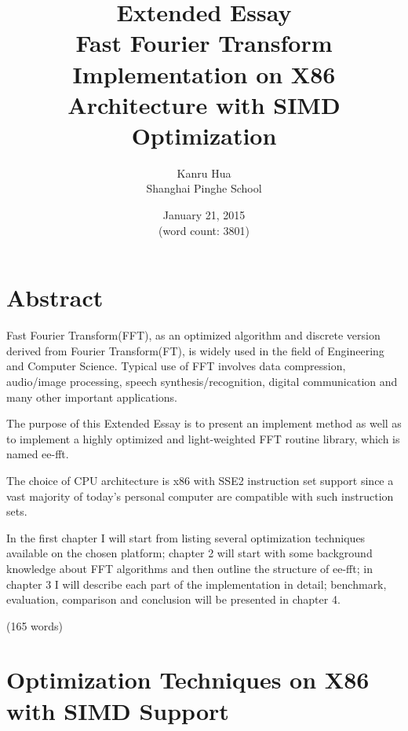 \documentclass[a4paper]{report}
\begin{document}
\title{\Huge{Extended Essay} \\[2cm] \Large{Fast Fourier Transform Implementation on X86 Architecture with SIMD Optimization} \\[1cm]}
\author{Kanru Hua \\[0.5cm] Shanghai Pinghe School}
\date{January 21, 2015 \\[1cm] (word count: 3801)}
\maketitle

\newpage

\chapter*{Abstract} \indent

	Fast Fourier Transform(FFT), as an optimized algorithm and discrete version derived from Fourier Transform(FT), is widely used in the field of Engineering and Computer Science. %
	Typical use of FFT involves data compression, audio/image processing, speech synthesis/recognition, digital communication and many other important applications.
	
	The purpose of this Extended Essay is to present an implement method as well as to implement a highly optimized and light-weighted FFT routine library, which is named ee-fft.

	The choice of CPU architecture is x86 with SSE2 instruction set support since a vast majority of today's personal computer are compatible with such instruction sets.
	
	In the first chapter I will start from listing several optimization techniques available on the chosen platform; chapter 2 will start with some background knowledge about FFT algorithms and then outline the structure of ee-fft; in chapter 3 I will describe each part of the implementation in detail; benchmark, evaluation, comparison and conclusion will be presented in chapter 4.
	
	\hfill (165 words)

\newpage
\tableofcontents

\newpage

\setcounter{page}{1}
\chapter{Optimization Techniques on X86 with SIMD Support} \indent
\end{document}
